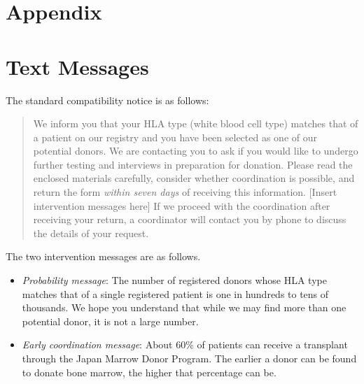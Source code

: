 \documentclass[12pt, a4paper]{article}
\providecommand{\tightlist}{%
  \setlength{\itemsep}{0pt}\setlength{\parskip}{0pt}}
\begin{document}
\clearpage

\appendix

\hypertarget{appendix}{%
\section*{Appendix}\label{appendix}}

\hypertarget{message}{%
\section{Text Messages}\label{message}}

The standard compatibility notice is as follows:

\begin{quote}
We inform you that your HLA type (white blood cell type) matches that of a patient on our registry and you have been selected as one of our potential donors. We are contacting you to ask if you would like to undergo further testing and interviews in preparation for donation. Please read the enclosed materials carefully, consider whether coordination is possible, and return the form \emph{within seven days} of receiving this information. {[}Insert intervention messages here{]} If we proceed with the coordination after receiving your return, a coordinator will contact you by phone to discuss the details of your request.
\end{quote}

The two intervention messages are as follows.

\begin{itemize}
\tightlist
\item
  \emph{Probability message}: The number of registered donors whose HLA type matches that of a single registered patient is one in hundreds to tens of thousands. We hope you understand that while we may find more than one potential donor, it is not a large number.
\item
  \emph{Early coordination message}: About 60\% of patients can receive a transplant through the Japan Marrow Donor Program. The earlier a donor can be found to donate bone marrow, the higher that percentage can be.
\end{itemize}

\setcounter{figure}{0}
\setcounter{table}{0}
\renewcommand\thefigure{\thesection\arabic{figure}}
\renewcommand{\thetable}{\thesection\arabic{table}}
\renewcommand{\theHfigure}{\thesection\arabic{figure}}
\renewcommand{\theHtable}{\thesection\arabic{table}}
\end{document}
